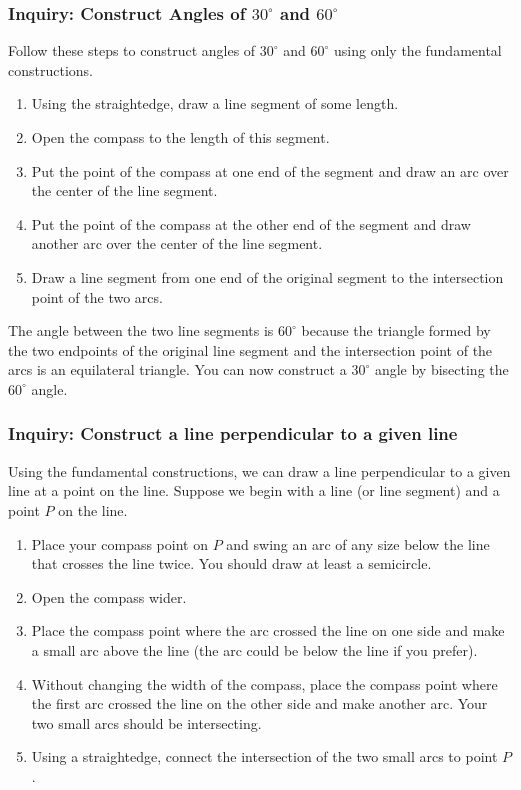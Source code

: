 \documentclass[11pt]{article}
\newenvironment{task}
	{\begin{mdframed}[linecolor=lightgray, linewidth=3pt]\raggedright}
	{\end{mdframed}}
\theoremstyle{definition}
\begin{document}
\subsubsection{Inquiry: Construct Angles of $30^\circ$ and $60^\circ$}
\begin{task}

Follow these steps to construct angles of $30^\circ$ and $60^\circ$ using only the fundamental constructions.
\begin{enumerate}
  \item Using the straightedge, draw a line segment of some length.
  \item Open the compass to the length of this segment.
  \item Put the point of the compass at one end of the segment and draw an arc over the center of the line segment.
  \item Put the point of the compass at the other end of the segment and draw another arc over the center of the line segment.
  \item Draw a line segment from one end of the original segment to the intersection point of the two arcs.
\end{enumerate}

The angle between the two line segments is $60^\circ$ because the triangle formed by the two endpoints of the original line segment and the
intersection point of the arcs is an equilateral triangle. You can now construct a $30^\circ$ angle by bisecting the $60^\circ$ angle.
\end{task}\newpage

\subsubsection{Inquiry: Construct a line perpendicular to a given line}
\begin{task}
  Using the fundamental constructions, we can draw a line perpendicular to a given line at a point on the line. Suppose we begin with a
  line (or line segment) and a point $P$ on the line.

  \begin{enumerate}
    \item Place your compass point on $P$ and swing an arc of any size below the line that crosses the line twice. You should draw at least a semicircle. 
    \item Open the compass wider.
    \item Place the compass point where the arc crossed the line on one side and make a small arc above the line (the arc could be below the line if you prefer).
    \item Without changing the width of the compass, place the compass point where the first arc crossed the line on the other side and make another arc. 
      Your two small arcs should be intersecting.
    \item Using a straightedge, connect the intersection of the two small arcs to point $P$.
  \end{enumerate}
\end{task}\newpage
\end{document}
